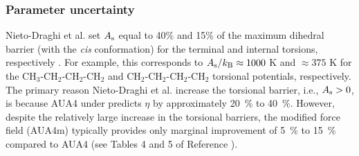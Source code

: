 \documentclass[preprint,review,12pt]{elsarticle}
\begin{document}
%	

    \subsubsection{Parameter uncertainty} \label{sec:parameter_uncertainty}

	Nieto-Draghi et al. set $A_{\rm s}$ equal to 40\% and 15\% of the maximum dihedral barrier (with the \textit{cis} conformation) for the terminal and internal torsions, respectively \cite{Nieto2006,Nieto2008}. For example, this corresponds to $A_{\rm s}/k_{\rm B} \approx 1000$ K and $\approx 375$ K for the CH$_3$-CH$_2$-CH$_2$-CH$_2$ and CH$_2$-CH$_2$-CH$_2$-CH$_2$ torsional potentials, respectively. The primary reason Nieto-Draghi et al. increase the torsional barrier, i.e., $A_{\rm s} > 0$, is because AUA4 under predicts $\eta$ by approximately 20~\% to 40~\%. However, despite the relatively large increase in the torsional barriers, the modified force field (AUA4m) typically provides only marginal improvement of 5~\% to 15~\% compared to AUA4 (see Tables 4 and 5 of Reference ). 
	
	
	
\end{document}
